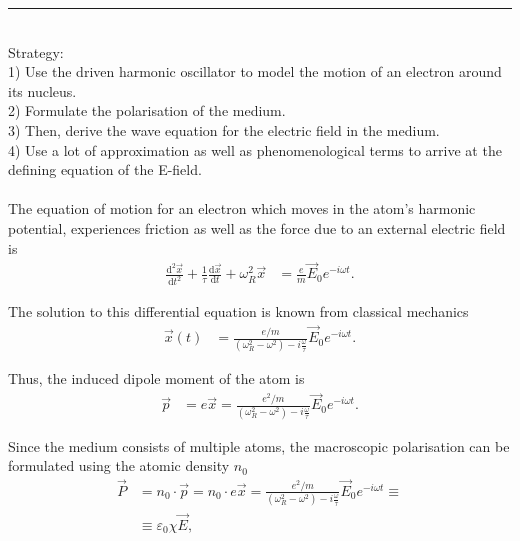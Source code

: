 \documentclass{article}
\newcommand{\diff}{\mathrm{d}}
\begin{document}
{\color{violet}
\hrule
	\\
	Strategy:\\
	1) Use the driven harmonic oscillator to model the motion of an electron around its nucleus.\\
	2) Formulate the polarisation of the medium.\\
	3) Then, derive the wave equation for the electric field in the medium.\\
	4) Use a lot of approximation as well as phenomenological terms to arrive at the defining equation of the E-field.\\
	\\
	The equation of motion for an electron which moves in the atom's harmonic potential, experiences friction as well as the force due to an external electric field is
		\begin{align*}
			\frac{\diff^2\vec{x}}{\diff t^2} + \frac{1}{\tau} \frac{\diff \vec{x}}{\diff t} + \omega_R^2 \vec{x} &= \frac{e}{m} \vec{E}_0 e^{-i\omega t}.
		\end{align*}
	
	The solution to this differential equation is known from classical mechanics
		\begin{align*}
			\vec{x}(t) &= \frac{e/m}{ (\omega_R^2 - \omega^2) - i\frac{\omega}{\tau} } \vec{E}_0 e^{-i\omega t}.
		\end{align*}

	Thus, the induced dipole moment of the atom is
		\begin{align*}
			\vec{p} &= e\vec{x} = \frac{e^2/m}{ (\omega_R^2 - \omega^2) - i\frac{\omega}{\tau} } \vec{E}_0 e^{-i\omega t}.
		\end{align*}

	Since the medium consists of multiple atoms, the macroscopic polarisation can be formulated using the atomic density $n_0$
		\begin{align*}
			\vec{P} &= n_0 \cdot \vec{p} = n_0 \cdot e\vec{x} = \frac{e^2/m}{ (\omega_R^2 - \omega^2) - i\frac{\omega}{\tau} } \vec{E}_0 e^{-i\omega t} \equiv \\
			&\equiv \varepsilon_0 \chi \vec{E},
		\end{align*}

}
\end{document}
